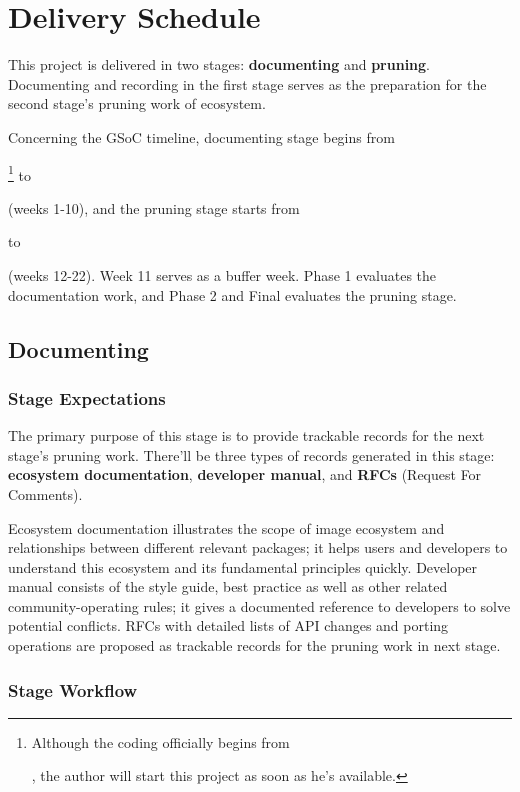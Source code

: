 
\section{Delivery Schedule}\label{sec:delivery}

This project is delivered in two stages: \textbf{documenting} and \textbf{pruning}. Documenting and recording in the first stage serves as the preparation for the second stage's pruning work of \images{} ecosystem.\par

Concerning the GSoC timeline, documenting stage begins from \date{April 22}\footnote{Although the coding officially begins from \date{May 27}, the author will start this project as soon as he's available.} to \date{June 24} (weeks 1-10), and the pruning stage starts from \date{July 1} to \date{August 26} (weeks 12-22). Week 11 serves as a buffer week. \textsf{Phase 1} evaluates the documentation work, and \textsf{Phase 2} and \textsf{Final} evaluates the pruning stage.

\subsection{Documenting}\label{subsec:documentation}

\subsubsection*{Stage Expectations}

The primary purpose of this stage is to provide trackable records for the next stage's pruning work. There'll be three types of records generated in this stage: \textbf{ecosystem documentation}, \textbf{developer manual}, and \textbf{RFCs} (Request For Comments). \par

Ecosystem documentation illustrates the scope of image ecosystem and relationships between different relevant packages; it helps users and developers to understand this ecosystem and its fundamental principles quickly. Developer manual consists of the style guide, best practice as well as other related community-operating rules; it gives a documented reference to developers to solve potential conflicts. RFCs with detailed lists of API changes and porting operations are proposed as trackable records for the pruning work in next stage. \par

\subsubsection*{Stage Workflow}

